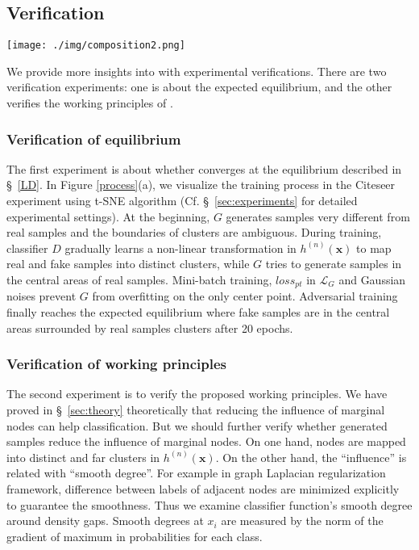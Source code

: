 
\subsection{Verification}
\label{sec:verify}

\begin{figure*}[htbp]
 \centering
  \texttt{[image: ./img/composition2.png]}
 \caption{(a)Visualization of outputs of feature layer during training. Color of point indicates its class, where black nodes indicate fake samples. 
 	 (b)Typical $||g||$ and $p_f$ curve for marginal nodes. Horizontal axis represents the number of training iterations, vertical axis representing the value. (c) Typical $||g||$ and $p_f$ curve for interior nodes.}\label{process}
 \end{figure*}


We provide more insights into \smodel with experimental verifications. There are two verification experiments: one is about the expected equilibrium, and the other verifies the working principles of \model.

\subsubsection{Verification of equilibrium}
The first experiment 
is about whether \smodel converges at the equilibrium described in \S~\ref{LD}. In Figure \ref{process}(a), we visualize the training process in the Citeseer experiment using t-SNE algorithm (Cf. \S~\ref{sec:experiments} for detailed experimental settings). At the beginning, $G$ generates samples very different from real samples and the boundaries of clusters are ambiguous. During training, classifier $D$ gradually learns a non-linear transformation in $h^{(n)}(\mathbf{x})$ to map real and fake samples into distinct clusters, while $G$ tries to generate samples in the central areas of real samples. Mini-batch training, $loss_{pt}$ in $\mathcal{L}_G$ and Gaussian noises prevent $G$ from overfitting on the only center point. Adversarial training finally reaches the expected equilibrium where fake samples are in the central areas surrounded by real samples clusters after 20 epochs. 

\subsubsection{Verification of working principles}

The second experiment is to verify the proposed working principles. We have proved in \S~\ref{sec:theory} theoretically that reducing the influence of marginal nodes can help classification. But we should further verify whether generated samples reduce the influence of marginal nodes. On one hand, nodes are mapped into distinct and far clusters in $h^{(n)}(\mathbf{x})$. On the other hand, the ``influence'' is related with ``smooth degree''. For example in graph Laplacian regularization framework, difference between labels of adjacent nodes are minimized explicitly to guarantee the smoothness. 
Thus we examine classifier function's smooth degree around density gaps. Smooth degrees at $x_i$ are measured  by the norm of the gradient of maximum in probabilities for each class. 

